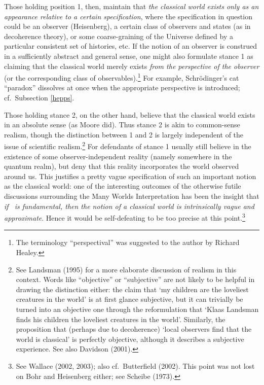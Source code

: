 \documentclass[12pt,titlepage]{article}
\begin{document}
Those holding position 1, then, maintain that {\it the classical world exists only
as an appearance relative to a certain specification}, where the specification in question could be an observer (Heisenberg), a certain class of observers and states (as in decoherence theory), or some  coarse-graining of the Universe defined by a particular consistent set of histories, etc. If the notion of an observer  is construed in a sufficiently abstract and general sense, one might also 
formulate stance 1 as claiming that the classical world merely exists  {\it from the perspective of the observer} (or the corresponding class of observables).\footnote{The  terminology ``perspectival'' was suggested to the author by Richard Healey.}  For example,
 Schr\"{o}dinger's cat ``paradox'' dissolves at once when the appropriate perspective is introduced; cf.\ Subsection \ref{hepps}. 
 
Those holding stance 2, on the other hand,  believe that the classical world exists in an absolute sense (as Moore did). Thus stance 2 is akin to common-sense realism, though the distinction between 1 and 2 is largely independent of the issue of scientific realism.\footnote{See  Landsman (1995) for a more elaborate discussion of 
realism in this context.  Words like ``objective'' or ``subjective'' are not likely to be helpful in drawing the distinction either: the claim that `my children are the loveliest creatures in the world' is at first glance subjective, but it can trivially be turned into an objective one through the reformulation that `Klaas Landsman finds his  children the loveliest creatures in the world'. Similarly, the proposition that 
(perhaps due to decoherence)  `local observers find that the world is classical' is perfectly objective, although it describes a subjective experience. See also Davidson (2001). }
For  defendants of stance 1 usually still believe in the existence of some observer-independent reality (namely somewhere in the quantum realm), but deny that this reality incorporates the world observed around us.  This justifies a pretty vague specification of such an important notion as the classical world: one of the interesting outcomes of the otherwise futile discussions surrounding the Many Worlds Interpretation has been the insight that  {\it if \qm\ is fundamental, then the notion of a classical world is intrinsically vague and approximate}. Hence it would be self-defeating to be too precise at this point.\footnote{See Wallace (2002, 2003); also cf.\ Butterfield (2002). This point was not lost on Bohr and Heisenberg either; see Scheibe (1973).}
\end{document}
